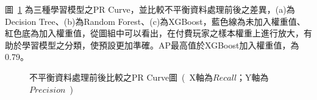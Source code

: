 圖~\ref{fig:eva_PRCurveEvaluationImbalancedData} 為三種學習模型之PR Curve，並比較不平衡資料處理前後之差異，(a)為Decision Tree、(b)為Random Forest、(c)為XGBoost，藍色線為未加入權重值、紅色底為加入權重值，從圖組中可以看出，在付費玩家之樣本權重上進行放大，有助於學習模型之分類，使預設更加準確。AP最高值於XGBoost加入權重值，為0.79。

\begin{figure}[!htb]
    \centering
    \caption[不平衡資料處理前後比較之PR Curve圖]{不平衡資料處理前後比較之PR Curve圖\ (\ X軸為$Recall$；Y軸為$Precision$\ )}
    \label{fig:eva_PRCurveEvaluationImbalancedData}
\end{figure}

